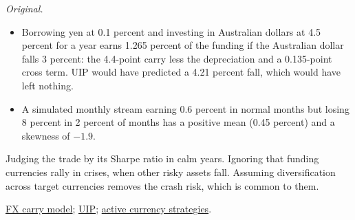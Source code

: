 \begin{qfmethod}
 \emph{Original.}
\begin{itemize}
\item Borrowing yen at 0.1 percent and investing in Australian dollars at 4.5 percent for a year earns 1.265 percent of the funding if the Australian dollar falls 3 percent: the 4.4-point carry less the depreciation and a 0.135-point cross term. UIP would have predicted a 4.21 percent fall, which would have left nothing.
\item A simulated monthly stream earning 0.6 percent in normal months but losing 8 percent in 2 percent of months has a positive mean (0.45 percent) and a skewness of $-1.9$.
\end{itemize}

 Judging the trade by its Sharpe ratio in calm years. Ignoring that funding currencies rally in crises, when other risky assets fall. Assuming diversification across target currencies removes the crash risk, which is common to them.

 \hyperref[mod:fx-carry-trade]{FX carry model}; \hyperref[res:international-parity-conditions]{UIP}; \hyperref[meth:active-currency-strategies]{active currency strategies}.

\end{qfmethod}

